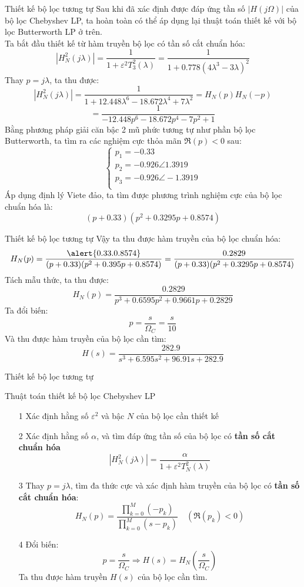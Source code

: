 \documentclass[8pt]{beamer}
\begin{document}
\begin{frame}{Thiết kế bộ lọc tương tự}
Sau khi đã xác định được đáp ứng tần số $|H(j\Omega)|$ của bộ lọc Chebyshev LP, ta hoàn toàn có thể áp dụng lại thuật toán thiết kế với bộ lọc Butterworth LP ở trên.
\\ Ta bắt đầu thiết kế từ hàm truyền bộ lọc có \alert{tần số cắt chuẩn hóa}:
$$|H_{N}^2(j\lambda)|=\frac{1}{1+\varepsilon^2 T^2_{3}(\lambda)}=\frac{1}{1+0.778(4\lambda^3-3\lambda)^2}$$
Thay $p=j\lambda$, ta thu được:
$$|H^2_{N}(j\lambda)|=\frac{1}{1+12.448\lambda^6-18.672\lambda^4+7\lambda^2}=H_{N}(p)H_{N}(-p)$$$$=\frac{1}{-12.448p^6-18.672p^4-7p^2+1}$$
Bằng phương pháp giải căn bậc 2 mũ phức tương tự như phần bộ lọc Butterworth, ta tìm ra các nghiệm cực thỏa mãn $\Re{(p)}<0$ sau:
\begin{equation*}
\begin{cases}
	p_{1}=-0.33\\
	p_{2}=-0.926\angle 1.3919\\
	p_{3}=-0.926\angle -1.3919\\
\end{cases}
\end{equation*}
Áp dụng định lý Viete đảo, ta tìm được phương trình nghiệm cực của bộ lọc chuẩn hóa là:
$$(p+0.33)(p^2+0.3295p+0.8574)$$
\end{frame}
\begin{frame}{Thiết kế bộ lọc tương tự}
Vậy ta thu được hàm truyền của bộ lọc chuẩn hóa:
$$H_{N}(p)=\frac{\alert{0.33 . 0.8574}}{(p+0.33)(p^2+0.395p+0.8574)}=\frac{0.2829}{(p+0.33)(p^2+0.3295p+0.8574)}$$
Tách mẫu thức, ta thu được:
$$H_{N}(p)=\frac{0.2829}{p^3+0.6595p^2+0.9661p+0.2829}$$
Ta đổi biến: $$p=\frac{s}{\Omega_{C}}=\frac{s}{10}$$
Và thu được hàm truyền của bộ lọc cần tìm:
$$H(s)=\frac{282.9}{s^3+6.595s^2+96.91s+282.9}$$
\end{frame}
\begin{frame}{Thiết kế bộ lọc tương tự}
\begin{block}{Thuật toán thiết kế bộ lọc Chebyshev LP}
\begin{enumerate}
	\item[1] Xác định hằng số $\varepsilon^2$ và bậc $N$ của bộ lọc cần thiết kế
	\item[2] Xác định hằng số $\alpha$, và tìm đáp ứng tần số của bộ lọc có \textbf{tần số cắt chuẩn hóa}
		$$|H_{N}^2(j\lambda)|=\frac{\alpha}{1+\varepsilon^2 T^2_{N}(\lambda)}$$
	\item[3] Thay $p=j\lambda$, tìm đa thức cực và xác định hàm truyền của bộ lọc có \textbf{tần số cắt chuẩn hóa}:
		$$H_{N}(p)=\frac{\prod_{k=0}^{M}(-p_{k})}{\prod_{k=0}^{M}(s-p_{k})}\quad(\Re{(p_{k})}<0)$$
	\item[4] Đổi biến: $$p=\frac{s}{\Omega_{C}}\Rightarrow H(s)=H_{N}\left(\frac{s}{\Omega_{C}}\right)$$ Ta thu được hàm truyền $H(s)$ của bộ lọc cần tìm.
\end{enumerate}
\end{block}
\end{frame}
\end{document}
